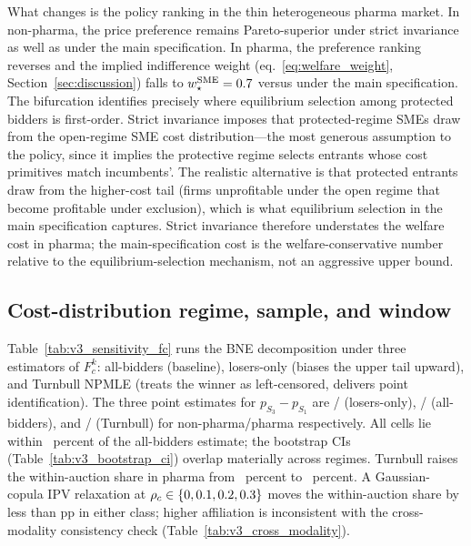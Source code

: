 What changes is the policy ranking in the thin heterogeneous pharma market. In non-pharma, the \optPrefThreshold{} price preference remains Pareto-superior under strict invariance as well as under the main specification. In pharma, the preference ranking reverses and the implied indifference weight (eq.~\ref{eq:welfare_weight}, Section~\ref{sec:discussion}) falls to $w^{\text{SME}}_\star = 0.7$ versus \welfWeightMainPh{} under the main specification. The bifurcation identifies precisely where equilibrium selection among protected bidders is first-order. Strict invariance imposes that protected-regime SMEs draw from the open-regime SME cost distribution---the most generous assumption to the policy, since it implies the protective regime selects entrants whose cost primitives match incumbents'. The realistic alternative is that protected entrants draw from the higher-cost tail (firms unprofitable under the open regime that become profitable under exclusion), which is what equilibrium selection in the main specification captures. Strict invariance therefore understates the welfare cost in pharma; the main-specification cost is the welfare-conservative number relative to the equilibrium-selection mechanism, not an aggressive upper bound.

\subsection{Cost-distribution regime, sample, and window}

Table~\ref{tab:v3_sensitivity_fc} runs the BNE decomposition under three estimators of $F_c^k$: all-bidders (baseline), losers-only (biases the upper tail upward), and Turnbull NPMLE (treats the winner as left-censored, delivers point identification). The three point estimates for $p_{S_3} - p_{S_1}$ are \costRegimeLosersNp/\costRegimeLosersPh{} (losers-only), \costRegimeAllNp/\costRegimeAllPh{} (all-bidders), and \costRegimeTurnNp/\costRegimeTurnPh{} (Turnbull) for non-pharma/pharma respectively. All cells lie within \turnbullDeviationPct~percent of the all-bidders estimate; the bootstrap CIs (Table~\ref{tab:v3_bootstrap_ci}) overlap materially across regimes. Turnbull raises the within-auction share in pharma from \bneShareIntensPh~percent to \turnPhShareUp~percent. A Gaussian-copula IPV relaxation at $\rho_c \in \{0, 0.1, 0.2, 0.3\}$ moves the within-auction share by less than \ipvShareDriftPp{} pp in either class; higher affiliation is inconsistent with the cross-modality consistency check (Table~\ref{tab:v3_cross_modality}).

